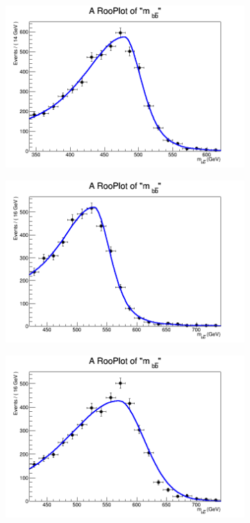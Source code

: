 \begin{figure}[phtb!]
\begin{center}
  \begin{subfigure}[$m_{A}=500$ GeV]{0.4\textwidth}\includegraphics[width=\textwidth]{FitResults/images/fitMC_bAbb500_1.png}\end{subfigure}
  \begin{subfigure}[$m_{A}=550$ GeV]{0.4\textwidth}\includegraphics[width=\textwidth]{FitResults/images/fitMC_bAbb550_1.png}\end{subfigure}
  \begin{subfigure}[$m_{A}=600$ GeV]{0.4\textwidth}\includegraphics[width=\textwidth]{FitResults/images/fitMC_bAbb600_1.png}\end{subfigure}

\end{center}
\end{figure}
